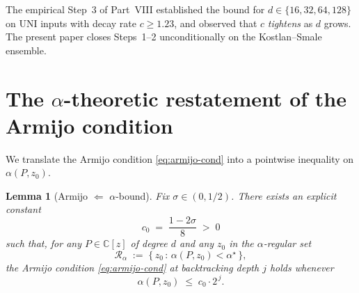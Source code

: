 \documentclass[11pt,a4paper]{article}
\newtheorem{lemma}[theorem]{Lemma}
\begin{document}
The empirical Step~3 of Part~VIII established the bound for $d \in \{16, 32, 64, 128\}$ on UNI inputs with decay rate $c \ge 1.23$, and observed that $c$ \emph{tightens} as $d$ grows. The present paper closes Steps~1--2 unconditionally on the Kostlan--Smale ensemble.

\section{The $\alpha$-theoretic restatement of the Armijo condition}\label{sec:alpha-armijo}

We translate the Armijo condition \eqref{eq:armijo-cond} into a pointwise inequality on $\alpha(P, z_0)$.

\begin{lemma}[Armijo $\Leftarrow$ $\alpha$-bound]\label{lem:armijo-alpha}
Fix $\sigma \in (0, 1/2)$. There exists an explicit constant
\begin{equation}\label{eq:c0-def}
c_0 \;=\; \frac{1 - 2 \sigma}{8} \;>\; 0
\end{equation}
such that, for any $P \in \mathbb{C}[z]$ of degree $d$ and any $z_0$ in the $\alpha$-regular set
\begin{equation}\label{eq:alpha-regular}
\mathcal{R}_\alpha \;:=\; \bigl\{\, z_0 \,:\, \alpha(P, z_0) < \alpha^\star \,\bigr\},
\end{equation}
the Armijo condition \eqref{eq:armijo-cond} at backtracking depth $j$ holds whenever
\begin{equation}\label{eq:alpha-armijo}
\alpha(P, z_0) \;\le\; c_0 \cdot 2^{\,j}.
\end{equation}
\end{lemma}
\end{document}
